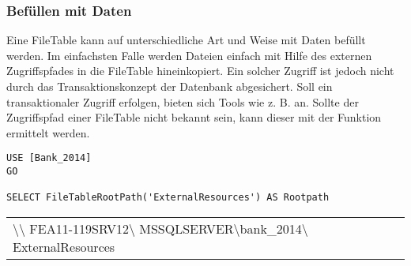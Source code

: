         \subsubsection{Befüllen mit Daten}
          Eine FileTable kann auf unterschiedliche Art und Weise mit Daten
          befüllt werden. Im einfachsten Falle werden Dateien einfach mit Hilfe
          des externen Zugriffspfades in die FileTable hineinkopiert. Ein
          solcher Zugriff ist jedoch nicht durch das Transaktionskonzept der
          Datenbank abgesichert. Soll ein transaktionaler Zugriff erfolgen,
          bieten sich Tools wie z. B.  an. Sollte der
          Zugriffspfad einer FileTable nicht bekannt sein, kann dieser mit der
          Funktion  ermittelt werden.
          \begin{lstlisting}[language=ms_sql, caption={Zugriffspfad zu einer
          FileTable ermitteln}, label=admin04_05a]
USE [Bank_2014]
GO

SELECT FileTableRootPath('ExternalResources') AS Rootpath
          \end{lstlisting}
          \begin{center}
            \begin{small}
              \tablehead{}
              \begin{mssql}
                \begin{supertabular}{l}
                 \textbackslash\textbackslash
                 FEA11-119SRV12\textbackslash
                 MSSQLSERVER\textbackslash bank\_2014\textbackslash
                 ExternalResources
                 \\
                \end{supertabular}
              \end{mssql}
            \end{small}
          \end{center}
          
